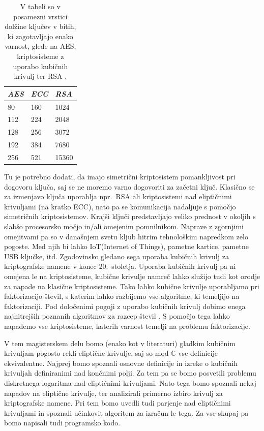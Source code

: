 \documentclass[12pt,a4paper,twoside]{article}
\theoremstyle{definition} %
\theoremstyle{plain} %
\numberwithin{equation}{section}  %
\renewcommand{\C}{\mathbb C}
\begin{document}
\begin{table}[h]
\centering
\begin{tabular}{|l|l|l|}
\hline
\textit{\textbf{AES}} & \textit{\textbf{ECC}} & \textit{\textbf{RSA}} \\ \hline
80                    & 160                   & 1024                  \\ \hline
112                   & 224                   & 2048                  \\ \hline
128                   & 256                   & 3072                  \\ \hline
192                   & 384                   & 7680                  \\ \hline
256                   & 521                   & 15360                 \\ \hline
\end{tabular}
 \caption[Primerjava kriptosistemov.]{V tabeli so v posamezni vrstici dolžine ključev v bitih, ki zagotavljajo enako varnost, glede na AES, kriptosisteme z uporabo kubičnih krivulj ter RSA \cite{NIST}.}
\end{table}
Tu je potrebno dodati, da imajo simetrični kriptosistem pomankljivost pri dogovoru ključa, saj se ne moremo varno dogovoriti za začetni ključ. Klasično se za izmenjavo ključa uporablja npr.\ RSA ali kriptosistemi nad eliptičnimi krivuljami (na kratko ECC), nato pa se komunikacija nadaljuje s pomočjo simetričnih kriptosistemov. Krajši ključi predstavljajo veliko prednost v okoljih s slabšo procesorsko močjo in/ali omejenim pomnilnikom. Naprave z zgornjimi omejitvami pa so v današnjem svetu kljub hitrim tehnološkim napredkom zelo pogoste. Med njih bi lahko IoT(Internet of Things), pametne kartice, pametne USB ključke, itd. Zgodovinsko gledano sega uporaba kubičnih krivulj za kriptografske namene v konec 20.\ stoletja. Uporaba kubičnih krivulj pa ni omejena le na kriptosisteme, kubične krivulje namreč lahko služijo tudi kot orodje za napade na klasične kriptosisteme. Tako lahko kubične krivulje uporabljamo pri faktorizacijo števil, s katerim lahko razbijemo vse algoritme, ki temeljijo na faktorizaciji.  Pod določenimi pogoji z uporabo kubičnih krivulj dobimo enega najhitrejših poznanih algoritmov za razcep števil \cite{Lenstra1987}. S pomočjo tega lahko napademo vse kriptosisteme, katerih varnost temelji na problemu faktorizacije.

V tem magisterskem delu bomo (enako kot v literaturi) gladkim kubičnim krivuljam pogosto rekli eliptične krivulje, saj so mod $\C$ vse definicije ekvivalentne.
Najprej  bomo spoznali osnovne definicije in izreke o kubičnih krivuljah definiranimi nad končnimi polji. Za tem pa se bomo posvetili problemu diskretnega logaritma nad eliptičnimi krivuljami. Nato tega bomo spoznali nekaj napadov na eliptične krivulje, ter analizirali primerno izbiro krivulj za kriptografske namene. Pri tem bomo uvedli tudi parjenje nad eliptičnimi krivuljami in spoznali učinkovit algoritem za izračun le tega. Za vse skupaj pa bomo napisali tudi programsko kodo.
\end{document}
